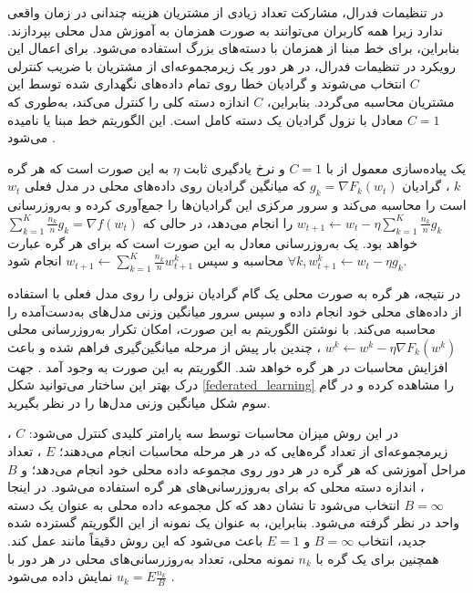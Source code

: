در تنظیمات فدرال، مشارکت تعداد زیادی از مشتریان هزینه چندانی در زمان واقعی ندارد زیرا همه کاربران می‌توانند به صورت همزمان به آموزش مدل محلی بپردازند. بنابراین، برای خط مبنا از
همزمان با دسته‌های بزرگ استفاده می‌شود. برای اعمال این رویکرد در تنظیمات فدرال، در هر دور یک زیرمجموعه‌ای از مشتریان با ضریب کنترلی 
$C$
انتخاب می‌شوند و گرادیان خطا روی تمام داده‌های نگهداری شده توسط این مشتریان محاسبه می‌گردد. بنابراین،
$C$
اندازه دسته کلی را کنترل می‌کند، به‌طوری که
$C = 1$
معادل با نزول گرادیان یک دسته کامل است. این الگوریتم خط مبنا
یا
نامیده می‌شود
\cite{mcmahan2017communication}.


یک پیاده‌سازی معمول از
با
$C = 1$
و نرخ یادگیری ثابت
$\eta$
به این صورت است که هر گره
$k$%
، گرادیان
$g_k=\nabla F_k\left(w_t\right)$
که میانگین گرادیان روی داده‌های محلی در مدل فعلی
$w_t$
است را محاسبه می‌کند و سرور مرکزی این گرادیان‌ها را جمع‌آوری کرده و به‌روزرسانی
$w_{t+1} \leftarrow w_t-\eta \sum_{k=1}^K \frac{n_k}{n} g_k$
را انجام می‌دهد، در حالی که
$\sum_{k=1}^K \frac{n_k}{n} g_k=\nabla f\left(w_t\right)$
خواهد بود. یک به‌روزرسانی معادل به این صورت است که برای هر گره عبارت
$\forall k, w_{t+1}^k \leftarrow w_t-\eta g_k$
محاسبه و سپس
$w_{t+1} \leftarrow \sum_{k=1}^K \frac{n_k}{n} w_{t+1}^k$
انجام شود.

در نتیجه، هر گره به صورت محلی یک گام گرادیان نزولی را روی مدل فعلی با استفاده از داده‌های محلی خود انجام داده و سپس سرور میانگین وزنی مدل‌های به‌دست‌آمده را محاسبه می‌کند. با نوشتن الگوریتم به این صورت، امکان تکرار به‌روزرسانی محلی
$w^k \leftarrow w^k-\eta \nabla F_k\left(w^k\right)$%
، چندین بار پیش از مرحله میانگین‌گیری فراهم شده و باعث افزایش محاسبات در هر گره خواهد شد. الگوریتم
به این صورت به وجود آمد
\cite{mcmahan2017communication}.
جهت درک بهتر این ساختار می‌توانید شکل
\ref{federated_learning}
را مشاهده کرده و در گام سوم شکل میانگین وزنی مدل‌ها را در نظر بگیرید.


در این روش میزان محاسبات توسط سه پارامتر کلیدی کنترل می‌شود:
$C$%
، زیرمجموعه‌ای از تعداد گره‌هایی که در هر مرحله محاسبات انجام می‌دهند؛
$E$%
، تعداد مراحل آموزشی که هر گره در هر دور روی مجموعه داده محلی خود انجام می‌دهد؛ و
$B$%
، اندازه دسته محلی که برای به‌روزرسانی‌های هر گره استفاده می‌شود. در اینجا
$B = \infty$
انتخاب می‌شود تا نشان دهد که کل مجموعه داده محلی به عنوان یک دسته واحد در نظر گرفته می‌شود. بنابراین، به عنوان یک نمونه از این الگوریتم گسترده شده جدید، انتخاب
$B = \infty$
و
$E = 1$
باعث می‌شود که این روش دقیقاً مانند
عمل کند. همچنین برای یک گره با
$n_k$
نمونه محلی، تعداد به‌روزرسانی‌های محلی در هر دور با
$u_k=E \frac{n_k}{B}$
نمایش داده می‌شود
\cite{mcmahan2017communication}.



